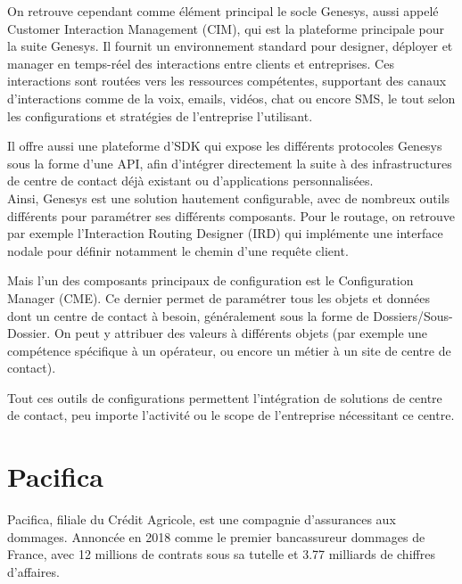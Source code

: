 \documentclass{rapport}
\begin{document}
On retrouve cependant comme élément principal le socle Genesys, aussi appelé Customer Interaction Management (CIM), qui est la plateforme principale pour la suite Genesys. Il fournit un environnement standard pour designer, déployer et manager en temps-réel des interactions entre clients et entreprises.
Ces interactions sont routées vers les ressources compétentes, supportant des canaux d'interactions comme de la voix, emails, vidéos, chat ou encore SMS, le tout selon les configurations et stratégies de l'entreprise l'utilisant.

Il offre aussi une plateforme d'SDK qui expose les différents protocoles Genesys sous la forme d'une API, afin d'intégrer directement la suite à des infrastructures de centre de contact déjà existant ou d'applications personnalisées.\\

Ainsi, Genesys est une solution hautement configurable, avec de nombreux outils différents pour paramétrer ses différents composants. Pour le routage, on retrouve par exemple l'Interaction Routing Designer (IRD) qui implémente une interface nodale pour définir notamment le chemin d'une requête client.

Mais l'un des composants principaux de configuration est le Configuration Manager (CME). Ce dernier permet de paramétrer tous les objets et données dont un centre de contact à besoin, généralement sous la forme de Dossiers/Sous-Dossier. On peut y attribuer des valeurs à différents objets (par exemple une compétence spécifique à un opérateur, ou encore un métier à un site de centre de contact).


Tout ces outils de configurations permettent l'intégration de solutions de centre de contact, peu importe l'activité ou le scope de l'entreprise nécessitant ce centre.

\newpage

\section{Pacifica}

Pacifica, filiale du Crédit Agricole, est une compagnie d'assurances aux dommages. Annoncée en 2018 comme le premier bancassureur dommages de France, avec 12 millions de contrats sous sa tutelle et 3.77 milliards de chiffres d'affaires.\\
\end{document}
